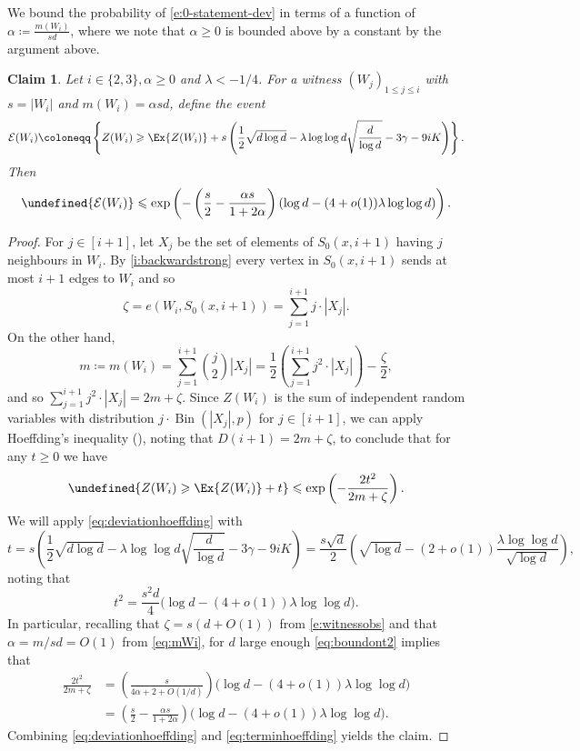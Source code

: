 \documentclass[reqno,a4paper,11pt]{amsart}
\newtheorem{claim}[theorem]{Claim}
\theoremstyle{definition}
\newcommand{\Bin}{\operatorname{Bin}}
\renewcommand{\leq}{\leqslant}
\renewcommand{\geq}{\geqslant}
\let\Pr\undefined
\begin{document}
We bound the probability of \eqref{e:0-statement-dev} in terms of a function of $\alpha \coloneqq \frac{m(W_i)}{sd}$, where we note that $\alpha \geq 0$ is bounded above by a constant by the argument above.
\begin{claim}\label{c:probboundalpha}
  Let $i \in \{2, 3\}, \alpha \geq 0$ and $\lambda<-1/4$. For a witness $(W_j)_{1 \leq j \leq i}$ with $s = |W_i|$ and $m(W_i)=\alpha s d$, define the event
  \[
    \mathcal{E}(W_i) \coloneqq \left\{ Z(W_i) \geq \Ex{Z(W_i)} + s\left(\frac{1}{2} \sqrt{d \log d} - \lambda \log \log d\sqrt{\frac{d}{\log d}} - 3 \gamma - 9iK\right) \right\}.
  \]
  Then
  \begin{equation}\label{e:boundonprob}
    \Pr{\mathcal{E}(W_i)} \leq \exp\left( -\left(\frac{s}{2} - \frac{\alpha s}{1+2\alpha}\right)\left(\log d - (4+o(1))\lambda \log \log d\right)\right).
  \end{equation}
\end{claim}
\begin{proof}
  For $j \in [i+1]$, let $X_j$ be the set of elements of $S_0(x,i+1)$ having $j$ neighbours in $W_i$.
  By \ref{i:backwardstrong} every vertex in $S_0(x, i+1)$ sends at most $i+1$ edges to $W_i$ and so
  \[
    \zeta = e(W_i, S_0(x, i+1)) = \sum_{j=1}^{i+1} j \cdot |X_j|.
  \]
  On the other hand,
  \[
    m \coloneqq m(W_i) = \sum_{j=1}^{i+1} \binom{j}{2} |X_j| = \frac{1}{2} \left( \sum_{j=1}^{i+1} j^2 \cdot |X_j|\right) - \frac{\zeta}{2},
  \]
  and so $\sum_{j=1}^{i+1} j^2 \cdot |X_j| = 2m + \zeta$.
  Since $Z(W_i)$ is the sum of independent random variables with distribution $j \cdot \Bin(|X_j|,p)$ for $j \in [i+1]$, we can apply Hoeffding's inequality (), noting that $D(i+1)=2m + \zeta$, to conclude that for any $t \geq 0$ we have
  \begin{equation}\label{eq:deviationhoeffding}
    \Pr{Z(W_i) \geq \Ex{Z(W_i)} + t} \leq \exp \left( - \frac{2t^2}{2m+\zeta}\right).
  \end{equation}
  We will apply \eqref{eq:deviationhoeffding} with
  \[
    t =s\left(\frac{1}{2} \sqrt{d \log d} - \lambda \log \log d\sqrt{\frac{d}{\log d}} - 3 \gamma - 9iK\right) = \frac{s\sqrt{d}}{2} \left(\sqrt{\log d} - (2 + o(1))\frac{\lambda \log\log d}{\sqrt{\log d}}\right),
  \]
  noting that
  \begin{equation}\label{eq:boundont2}
    t^2 = \frac{s^2 d}{4}\bigl(\log d - (4 + o(1)) \lambda \log \log d\bigr).
  \end{equation}
  In particular, recalling that $\zeta = s(d + O(1))$ from \eqref{e:witnessobs} and that $\alpha = m/sd = O(1)$ from \eqref{eq:mWi}, for $d$ large enough \eqref{eq:boundont2} implies that
  \begin{align}\label{eq:terminhoeffding}
    \frac{2t^2}{2m + \zeta} &= \left(\frac{s}{4\alpha + 2 + O(1/d)}\right)\bigl(\log d - (4 + o(1)) \lambda \log \log d\bigr)\nonumber\\
                            &= \left(\frac{s}{2} - \frac{\alpha s}{1 + 2\alpha}\right)\bigl(\log d - (4+o(1))\lambda \log \log d\bigr).
  \end{align}
  Combining \eqref{eq:deviationhoeffding} and \eqref{eq:terminhoeffding} yields the claim.
\end{proof}
\end{document}
